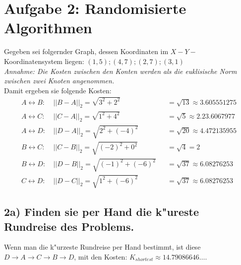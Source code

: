 \documentclass{scrartcl}
\begin{document}
\section*{Aufgabe 2: Randomisierte Algorithmen}
{\large{Gegeben sei folgernder Graph, dessen Koordinaten im 
$X-Y-$Koordinatensystem 
liegen: $(1,5); (4,7); (2,7); (3,1)$}} \\
\textit{Annahme: Die Kosten zwischen den Konten werden als die 
euklisische 
Norm zwischen zwei Knoten 
angenommen.} \\
Damit ergeben sie folgende Kosten:
\begin{align*}
A \leftrightarrow B\colon& ~||B-A||_2 = \sqrt{3^2 + 2^2} &&= \sqrt{13} 
\approx 
3.605551275\\
A \leftrightarrow C\colon& ~||C-A||_2 = \sqrt{1^2 + 4^2} &&= \sqrt{5} 
\approx 
2.23.6067977 \\
A \leftrightarrow D\colon& ~||D-A||_2 = \sqrt{2^2 + (-4)^2} &&= 
\sqrt{20} 
\approx 
4.472135955 \\
B \leftrightarrow C\colon& ~||C-B||_2 = \sqrt{(-2)^2 + 0^2} &&= \sqrt{4} 
= 2 \\
B \leftrightarrow D\colon& ~||D-B||_2 = \sqrt{(-1)^2 + (-6)^2} &&= 
\sqrt{37} 
\approx 6.08276253 \\
C \leftrightarrow D\colon& ~||D-C||_2 = \sqrt{1^2 + (-6)^2} &&= 
\sqrt{37} 
\approx 
6.08276253
\end{align*}
\begin{center}
\end{center}

\subsection*{2a) Finden sie per Hand die k"ureste Rundreise des 
Problems.}
Wenn man die k"urzeste Rundreise per Hand bestimmt, ist diese $D 
\rightarrow A 
\rightarrow C \rightarrow B \rightarrow D$, mit den Kosten: $K_{shortest} 
\approx 
14.79086646\ldots$. 
\end{document}
